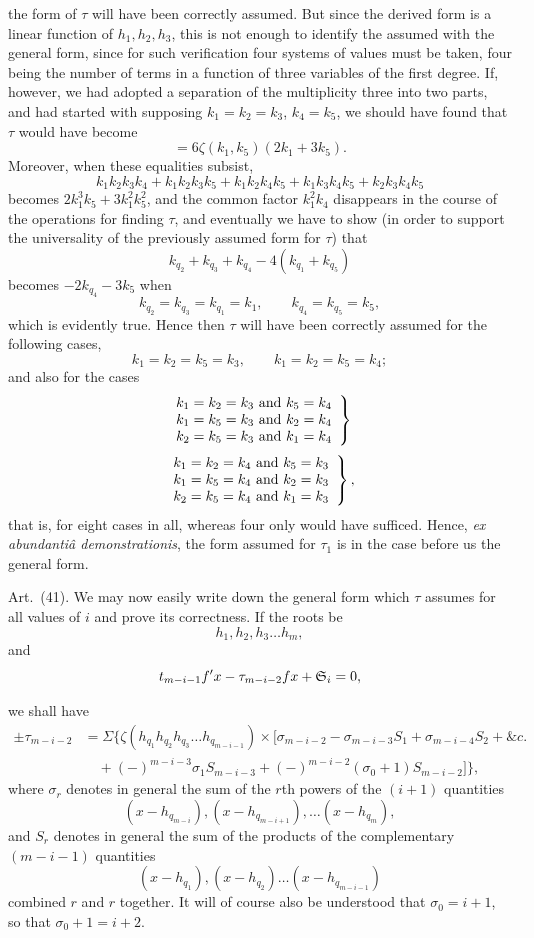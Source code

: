 \documentclass[11pt]{article}
\newcommand{\sourcepage}[1]{\marginpar{\scriptsize p.~#1}}
\newcommand{\art}[1]{\par\smallskip\noindent Art.~(#1).\quad}
\begin{document}
\sourcepage{492}
the form of $\tau$ will have been correctly assumed. But since the derived form is a linear function of $h_1,h_2,h_3$, this is not enough to identify the assumed with the general form, since for such verification four systems of values must be taken, four being the number of terms in a function of three variables of the first degree. If, however, we had adopted a separation of the multiplicity three into two parts, and had started with supposing $k_1=k_2=k_3$, $k_4=k_5$, we should have found that $\tau$ would have become
\[
=6\zeta(k_1,k_5)(2k_1+3k_5).
\]
Moreover, when these equalities subsist,
\[
k_1k_2k_3k_4+k_1k_2k_3k_5+k_1k_2k_4k_5+k_1k_3k_4k_5+k_2k_3k_4k_5
\]
becomes $2k_1^3k_5+3k_1^2k_5^2$, and the common factor $k_1^2k_4$ disappears in the course of the operations for finding $\tau$, and eventually we have to show (in order to support the universality of the previously assumed form for $\tau$) that
\[
k_{q_2}+k_{q_3}+k_{q_4}-4(k_{q_1}+k_{q_5})
\]
becomes $-2k_{q_4}-3k_5$ when
\[
k_{q_2}=k_{q_3}=k_{q_1}=k_1,
\qquad
k_{q_4}=k_{q_5}=k_5,
\]
which is evidently true. Hence then $\tau$ will have been correctly assumed for the following cases,
\[
k_1=k_2=k_5=k_3,
\qquad
k_1=k_2=k_5=k_4;
\]
and also for the cases
\[
\left.\begin{array}{l}
k_1=k_2=k_3\hbox{ and }k_5=k_4\cr
k_1=k_5=k_3\hbox{ and }k_2=k_4\cr
k_2=k_5=k_3\hbox{ and }k_1=k_4
\end{array}\right\}
\]
\[
\left.\begin{array}{l}
k_1=k_2=k_4\hbox{ and }k_5=k_3\cr
k_1=k_5=k_4\hbox{ and }k_2=k_3\cr
k_2=k_5=k_4\hbox{ and }k_1=k_3
\end{array}\right\},
\]
that is, for eight cases in all, whereas four only would have sufficed. Hence, \emph{ex abundantiâ demonstrationis}, the form assumed for $\tau_1$ is in the case before us the general form.

\art{41} We may now easily write down the general form which $\tau$ assumes for all values of $i$ and prove its correctness. If the roots be
\[
h_1,h_2,h_3\ldots h_m,
\]
and
\[
t_{m-i-1}f'x-\tau_{m-i-2}fx+\mathfrak{S}_i=0,
\]

\sourcepage{493}
we shall have
\[
\begin{aligned}
\pm\tau_{m-i-2}&=\Sigma\{\zeta(h_{q_1}h_{q_2}h_{q_3}\ldots h_{q_{m-i-1}})\times
[\sigma_{m-i-2}-\sigma_{m-i-3}S_1+\sigma_{m-i-4}S_2+\&c.\\
&\quad+(-)^{m-i-3}\sigma_1S_{m-i-3}+(-)^{m-i-2}(\sigma_0+1)S_{m-i-2}]\},
\end{aligned}
\]
where $\sigma_r$ denotes in general the sum of the $r$th powers of the $(i+1)$ quantities
\[
(x-h_{q_{m-i}}),(x-h_{q_{m-i+1}}),\ldots(x-h_{q_m}),
\]
and $S_r$ denotes in general the sum of the products of the complementary $(m-i-1)$ quantities
\[
(x-h_{q_1}),(x-h_{q_2})\ldots(x-h_{q_{m-i-1}})
\]
combined $r$ and $r$ together. It will of course also be understood that $\sigma_0=i+1$, so that $\sigma_0+1=i+2$.
\end{document}
